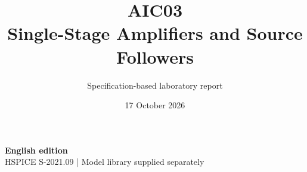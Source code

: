 \documentclass[11pt,a4paper]{article}
\title{\color{accent}AIC03\\[4pt]Single-Stage Amplifiers and Source Followers}
\author{Specification-based laboratory report}
\date{17 October 2026}
\begin{document}
\maketitle
\begin{center}\small\textbf{English edition}\\
HSPICE S-2021.09 \quad | \quad Model library supplied separately
\end{center}


\end{document}
